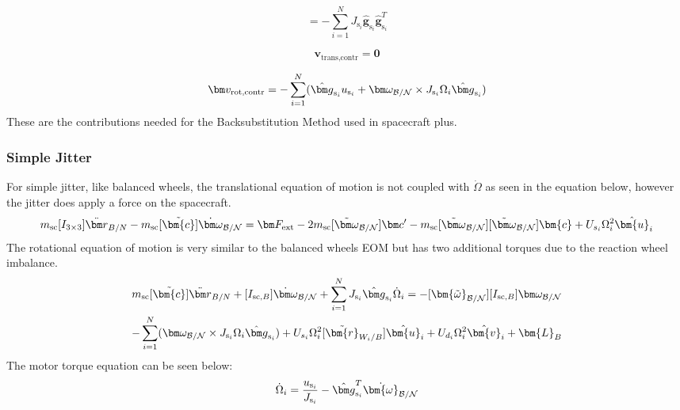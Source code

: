 \begin{equation}
[D_\text{contr}] = -\sum_{i=1}^{N}J_{\text{s}_i} \hat{\bm g}_{\text{s}_i} \hat{\bm g}_{\text{s}_i}^T
\end{equation}

\begin{equation}
\bm v_{\text{trans,contr}} = \bm 0
\end{equation}

\begin{equation}
\bm v_{\text{rot,contr}} =  - \sum_{i=1}^{N}(\hat{\bm g}_{\text{s}_i} u_{\text{s}_i} + \bm\omega_{\cal B/N}\times J_{\text{s}_i}\Omega_i\hat{\bm g}_{\text{s}_i})
\end{equation}
These are the contributions needed for the Backsubstitution Method used in spacecraft plus.

\subsubsection{Simple Jitter}

For simple jitter, like balanced wheels, the translational equation of motion is not coupled with $\dot{\Omega}$ as seen in the equation below, however the jitter does apply a force on the spacecraft.
\begin{equation}
m_{\text{sc}} [I_{3 \times 3}]\ddot{\bm r}_{B/N}
-m_{\text{sc}} [\tilde{\bm{c}}] \dot{\bm\omega}_{\cal B/N}
= \bm F_{\text{ext}}- 2 m_{\text{sc}} [\tilde{\bm\omega}_{\cal B/N}] \bm c'
-m_{\text{sc}} [\tilde{\bm\omega}_{\cal B/N}][\tilde{\bm\omega}_{\cal B/N}]\bm{c} + U_{s_i}\Omega_i^2\hat{\bm{u}}_i
\label{eq:Rbddot35}
\end{equation}
The rotational equation of motion is very similar to the balanced wheels EOM but has two additional torques due to the reaction wheel imbalance.
\begin{multline}
m_{\text{sc}}[\tilde{\bm{c}}] \ddot{\bm r}_{B/N}
+[I_{\text{sc},B}] \dot{\bm\omega}_{\cal B/N}
+\sum_{i=1}^{N}J_{\text{s}_i} \hat{\bm g}_{\text{s}_i}\dot{\Omega}_i
= -[\bm{\tilde{\omega}}_{\cal B/N}] [I_{\text{sc},B}] \bm\omega_{\cal B/N} \\
- \sum_{i=1}^{N}(\bm\omega_{\cal B/N}\times J_{\text{s}_i}\Omega_i\hat{\bm g}_{\text{s}_i})
+ U_{s_i}\Omega_i^2[\tilde{\bm{r}}_{W_i/B}]\hat{\bm{u}}_i + U_{d_i}\Omega_i^2\hat{\bm{v}}_i + \bm{L}_B
\label{eq:Final7}
\end{multline}
The motor torque equation can be seen below:
\begin{equation}
\dot{\Omega}_i = \frac{u_{\text{s}_i}}{J_{\text{s}_i}}-\hat{\bm g}_{\text{s}_i}^T \dot{\bm{\omega}}_{\cal B/N}
\label{eq:mtorque}
\end{equation}

